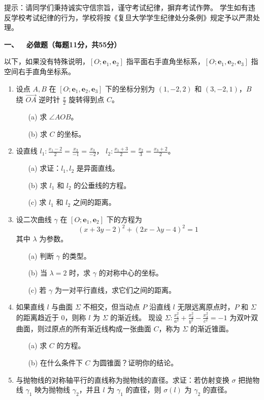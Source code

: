 \qquad 提示：请同学们秉持诚实守信宗旨，谨守考试纪律，摒弃考试作弊。
学生如有违反学校考试纪律的行为，学校将按《复旦大学学生纪律处分条例》规定予以严肃处理。


\textbf{一、\ \ 必做题（每题11分，共55分）}

\qquad 以下，如果没有特殊说明，$[O; \mathbf{e}_1, \mathbf{e}_2]$ 指平面右手直角坐标系，$[O; \mathbf{e}_1, \mathbf{e}_2, \mathbf{e}_3]$ 指空间右手直角坐标系。

\begin{enumerate}
    \item 设点 $A, B$ 在 $[O; \mathbf{e}_1, \mathbf{e}_2, \mathbf{e}_3]$ 下的坐标分别为 $(1,-2,2)$ 和 $(3,-2,1)$，$B$ 绕 $\overrightarrow{OA}$ 逆时针 $\frac{\pi}{2}$ 旋转得到点 $C$。
    \begin{enumerate}
        \item[(a)] 求 $\angle AOB$。
        \item[(b)] 求 $C$ 的坐标。
    \end{enumerate}

    \item 设直线 $l_1: \frac{x_1-2}{2} = \frac{x_2}{-1} = \frac{x_3}{-2}$， $l_2: \frac{x_1+3}{2} = \frac{x_2}{3} = \frac{x_3+2}{2}$。
    \begin{enumerate}
        \item[(a)] 求证：$l_1, l_2$ 是异面直线。
        \item[(b)] 求 $l_1$ 和 $l_2$ 的公垂线的方程。
        \item[(c)] 求 $l_1$ 和 $l_2$ 之间的距离。
    \end{enumerate}

    \item 设二次曲线 $\gamma$ 在 $[O; \mathbf{e}_1, \mathbf{e}_2]$ 下的方程为
    \[ (x+3y-2)^2 + (2x-\lambda y -4)^2 = 1 \]
    其中 $\lambda$ 为参数。
    \begin{enumerate}
        \item[(a)] 判断 $\gamma$ 的类型。
        \item[(b)] 当 $\lambda=2$ 时，求 $\gamma$ 的对称中心的坐标。
        \item[(c)] 若 $\gamma$ 为一对平行直线，求它们之间的距离。
    \end{enumerate}

    \item 如果直线 $l$ 与曲面 $\Sigma$ 不相交，但当动点 $P$ 沿直线 $l$ 无限远离原点时，$P$ 和 $\Sigma$ 的距离趋近于 $0$，则称 $l$ 为 $\Sigma$ 的渐近线。
    现设 $\Sigma: \frac{x_1^2}{a^2} + \frac{x_2^2}{b^2} - \frac{x_3^2}{c^2} = -1$ 为双叶双曲面，则过原点的所有渐近线构成一张曲面 $C$，称为 $\Sigma$ 的渐近锥面。
    \begin{enumerate}
        \item[(a)] 求 $C$ 的方程。
        \item[(b)] 在什么条件下 $C$ 为圆锥面？证明你的结论。
    \end{enumerate}

    \item 与抛物线的对称轴平行的直线称为抛物线的直径。求证：若仿射变换 $\sigma$ 把抛物线 $\gamma_1$ 映为抛物线 $\gamma_2$，并且 $l$ 为 $\gamma_1$ 的直径，则 $\sigma(l)$ 为 $\gamma_2$ 的直径。
\end{enumerate}

